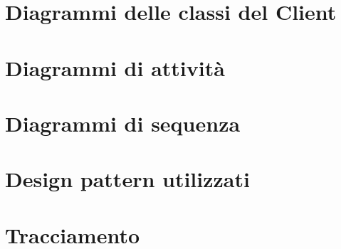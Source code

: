 \documentclass[a4paper,11pt]{article}
\begin{document}
	\section{Diagrammi delle classi del Client}
		
		
	
	\section{Diagrammi di attività}
		
	\section{Diagrammi di sequenza}
		
	\section{Design pattern utilizzati}
		
	
	\section{Tracciamento}
		
		
	
\end{document}
